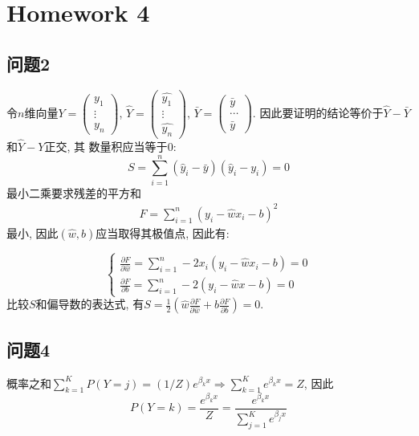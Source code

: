 \section{Homework 4}

\subsection{问题2}

令$n$维向量$Y=\left(\begin{array}{c}
    y_1 \\ \vdots \\ y_n
\end{array}\right)$, $\hat{Y}=\left(\begin{array}{c}
    \hat{y_1} \\ \vdots \\ \hat{y_n}
\end{array}\right)$, $\bar{Y}=\left(\begin{array}{c}
    \bar{y} \\ \cdots \\ \bar{y}
\end{array}\right)$. 因此要证明的结论等价于$\hat{Y}-\bar{Y}$和$\hat{Y}-Y$正交, 其
数量积应当等于$0$:
\begin{equation*}
    S=\sum_{i=1}^{n}(\hat{y}_i-\bar{y})(\hat{y}_i-y_i)=0
\end{equation*}
最小二乘要求残差的平方和
\begin{align*}
    F=\sum_{i=1}^{n}(y_i-\hat{w}x_i-b)^2
\end{align*}
最小, 因此$(\hat{w},b)$应当取得其极值点, 因此有:

\begin{equation*}
    \left\{
        \begin{array}{c}
            \displaystyle \frac{\partial F}{\partial \hat{w}}=\sum_{i=1}^{n}-2x_i(y_i-\hat{w}x_i-b)=0 \\
            \displaystyle \frac{\partial F}{\partial b}=\sum_{i=1}^{n}-2(y_i-\hat{w}x-b)=0
        \end{array}
    \right.
\end{equation*}
比较$S$和偏导数的表达式, 有$\displaystyle S=\frac{1}{2}(\hat{w}\frac{\partial F}
{\partial \hat{w}}+b\frac{\partial F}{\partial b})=0$.

\subsection{问题4}

概率之和$\displaystyle\sum_{k=1}^{K}P(Y=j)=(1/Z)e^{\beta_kx}\Rightarrow\sum_{k=1}^{K}e^{\beta_kx}=Z$, 因此
\begin{equation*}
    P(Y=k)=\frac{e^{\beta_kx}}{Z}=\frac{e^{\beta_kx}}{\sum_{j=1}^{K}e^{\beta_jx}}
\end{equation*}